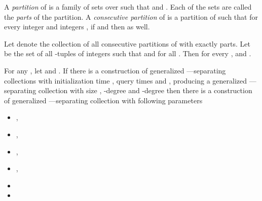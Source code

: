 \begin{definition}
A {\em partition} of  is a family  of sets over  such that  and . 
Each of the sets  are called the {\em parts} of the partition. A {\em consecutive partition} of  is a partition  of  
such that for every integer  and integers , if  and  then  as well. 
\end{definition}
\begin{proposition}
Let  denote the collection of all consecutive partitions of  with exactly  parts. Let 
 be the set of all -tuples  of integers such that  and  for all . 
Then for every ,  and .
\end{proposition}
\begin{lemma}\label{lem:splitSolution} For any ,  let  and 
. If there is a construction of generalized ---separating collections  
with initialization time , query times  and , 
producing a generalized ---separating collection with size , -degree 
 and -degree  then there is a construction 
of generalized ---separating collection with following parameters 
\begin{itemize}\item 
,
\item 
,
\item 
,
\item 
,
\item 

\item 

\end{itemize}
\end{lemma}
